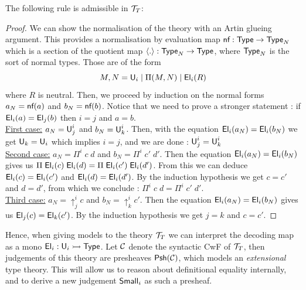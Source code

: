\documentclass{article}
\begin{document}
\begin{theoreme}\label{InjectivityTarki}
    The following rule is admissible in $\mathcal{T}_T$: 

    \begin{mathpar}
    \end{mathpar}
\end{theoreme}

\begin{proof}
    We can show the normalisation of the theory with an Artin glueing argument. This provides
    a normalisation by evaluation map $\textsf{nf} : \textsf{Type} \rightarrow \textsf{Type}_N$  which is a section
    of the quotient map $\langle . \rangle : \textsf{Type}_N \rightarrow \textsf{Type}$, where $\textsf{Type}_N$ is 
    the sort of normal types. Those are of the form \[M,N = \textsf{U}_i \; | \; \Pi(M,N) \; | \; \textsf{El}_i(R)\] where
    $R$ is neutral.
    Then, we proceed by induction on the normal forms $a_N = \textsf{nf}(a)$ and $b_N = \textsf{nf}(b)$. Notice that we need to prove a stronger statement : if $\textsf{El}_i(a) = \textsf{El}_j(b)$ then $i = j$ and $a = b$.\\

    \underline{First case:} $a_N = \textsf{U}_j^i$ and $b_N = \textsf{U}_k^i$. Then, with the equation $\textsf{El}_i(a_N) = \textsf{El}_i(b_N)$ we get $\textsf{U}_k = \textsf{U}_i$ which implies $i = j$, and we are done : $\textsf{U}_j^i = \textsf{U}_k^i$\\

    \underline{Second case:} $a_N = \Pi^i \; c \;d$ and $b_N = \Pi^i \; c' \; d'$. Then the equation $\textsf{El}_i(a_N) = \textsf{El}_i(b_N)$ gives us $\Pi \; \textsf{El}_i(c) \; \textsf{El}_i(d) = \Pi \; \textsf{El}_i(c') \; \textsf{El}_i(d')$.
    From this we can deduce $\textsf{El}_i(c) = \textsf{El}_i(c')$ and $\textsf{El}_i(d) = \textsf{El}_i(d')$. By the induction hypothesis we get $c = c'$ and $d = d'$, from which we conclude : $\Pi^i \; c \; d = \Pi^i \; c' \; d'$.\\

    \underline{Third case:} $a_N = \uparrow_j^i c$ and $b_N = \uparrow_k^i c'$. Then the equation $\textsf{El}_i(a_N) = \textsf{El}_i(b_N)$ gives us $\textsf{El}_j(c) = \textsf{El}_k(c')$. By the induction hypothesis we get $j = k$ and
    $c = c'$.


\end{proof}

Hence, when giving models to the theory $\mathcal{T}_T$ we can interpret the decoding map as a mono $\textsf{El}_i : \textsf{U}_i \rightarrowtail \textsf{Type}$.
Let $\mathcal{C}$ denote the syntactic CwF of $\mathcal{T}_T$, then judgements of this theory are presheaves $\textsf{Psh}(\mathcal{C})$, which models an \textit{extensional}
type theory. This will allow us to reason about definitional equality internally, and to derive a new judgement $\textsf{Small}_i$ as such a presheaf.
\end{document}

